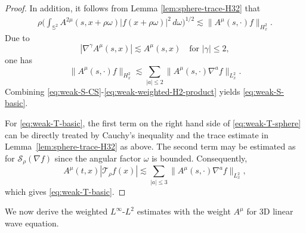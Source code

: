 \documentclass[11pt,twoside]{article}
\def\ls{\lesssim}
\theoremstyle{plain}
\theoremstyle{definition}
\theoremstyle{assumption}
\numberwithin{equation}{section}
\begin{document}
\begin{proof}
				In addition, it follows from Lemma \ref{lem:sphere-trace-H32} that
				\begin{equation}
					\label{eq:weak-weighted-sphere-trace}
					\begin{aligned}
						\rho
						\big(
						\int_{\mathbb S^2}
						A^{2\mu}(s,x+\rho\omega)
						|f(x+\rho\omega)|^2\,d\omega
						\big)^{1/2}
						\lesssim
						\|A^\mu(s,\cdot)f\|_{H^2_x}.
					\end{aligned}
				\end{equation}
				Due to
				\[
				|\nabla^\gamma A^\mu(s,x)|
				\lesssim
				A^\mu(s,x)
				\quad\text{for $|\gamma|\le2$},
				\]
				one has
				\begin{equation}
					\label{eq:weak-weighted-H2-product}
					\|A^\mu(s,\cdot)f\|_{H^2_x}
					\ls
					\sum_{|a|\le2}
					\|A^\mu(s,\cdot)\nabla^a f\|_{L^2_x}.
				\end{equation}
				Combining \eqref{eq:weak-S-CS}-\eqref{eq:weak-weighted-H2-product} yields
				\eqref{eq:weak-S-basic}.
				
				For \eqref{eq:weak-T-basic}, the first term on the right hand side of
				\eqref{eq:weak-T-sphere} can be directly treated by Cauchy's inequality and the trace estimate
				in Lemma~\ref{lem:sphere-trace-H32} as above. The second term may be estimated as
				for \(\mathcal S_\rho(\nabla f)\) since the angular factor \(\omega\) is bounded.
				Consequently,
				\[
				A^\mu(t,x)|\mathcal T_\rho f(x)|
				\ls
				\sum_{|a|\le3}
				\|A^\mu(s,\cdot)\nabla^a f\|_{L^2_x},
				\]
				which gives \eqref{eq:weak-T-basic}.
				
			\end{proof}
			
			
			We now derive the weighted $L^\infty$-$L^2$ estimates with the weight $A^\mu$ for 3D linear wave equation.
			
\end{document}
